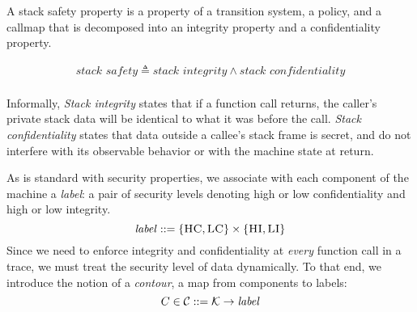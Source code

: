 \documentclass[acmsmall,review,anonymous]{acmart}\settopmatter{printfolios=true,printccs=false,printacmref=false}
\begin{document}
A stack safety property is a property of a transition system, a
policy, and a callmap that is decomposed into an integrity property and a
confidentiality property.

    \[\begin{split}
      \textit{stack safety} \triangleq \textit{stack integrity} \land \textit{stack confidentiality} \\
    \end{split}\]

 Informally, {\it Stack
  integrity} states that if a function call returns, the caller's
private stack data will be identical to what it was before the
call. {\it Stack confidentiality} states that data outside a callee's
stack frame is secret, and do not interfere with its observable
behavior or with the machine state at return.

As is standard with security properties, we associate with each
component of the machine a {\em label}: a pair of security levels
denoting high or low confidentiality and high or low integrity.
%
\[\mathit{label} ::= \{\textsc{HC},\textsc{LC}\} \times \{\textsc{HI},\textsc{LI}\}\]
%
Since we need to enforce integrity and confidentiality at {\em every}
function call in a trace, we must treat the security level of data
dynamically. To that end, we introduce the notion of a {\em contour},
a map from components to labels:
%
\[C \in {\mathcal C} ::= {\mathcal K} \rightarrow \mathit{label}\]
\end{document}
